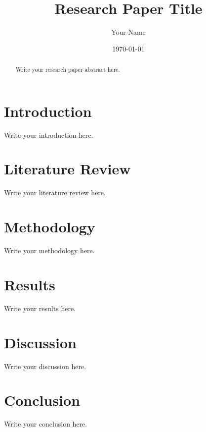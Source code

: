 \documentclass[12pt,a4paper]{article}
\title{Research Paper Title}
\author{Your Name}
\date{\today}
\begin{document}
\maketitle

\begin{abstract}
Write your research paper abstract here.
\end{abstract}

\section{Introduction}
Write your introduction here.

\section{Literature Review}
Write your literature review here.

\section{Methodology}
Write your methodology here.

\section{Results}
Write your results here.

\section{Discussion}
Write your discussion here.

\section{Conclusion}
Write your conclusion here.
\end{document}
